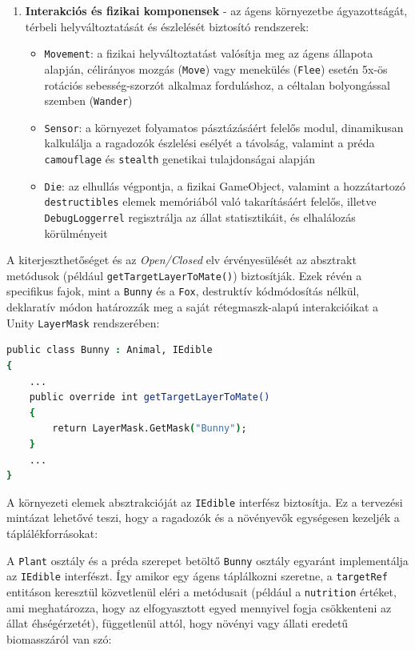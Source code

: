 \begin{enumerate}
    \item \textbf{Interakciós és fizikai komponensek} - az ágens környezetbe ágyazottságát, térbeli helyváltoztatását és észlelését biztosító rendszerek:
    \begin{itemize}
        \item \texttt{Movement}: a fizikai helyváltoztatást valósítja meg az ágens állapota alapján, célirányos mozgás (\texttt{Move}) vagy menekülés (\texttt{Flee}) esetén 5x-ös rotációs sebesség-szorzót alkalmaz forduláshoz, a céltalan bolyongással szemben (\texttt{Wander})
        \item \texttt{Sensor}: a környezet folyamatos pásztázásáért felelős modul, dinamikusan kalkulálja a ragadozók észlelési esélyét a távolság, valamint a préda \texttt{camouflage} és \texttt{stealth} genetikai tulajdonságai alapján
        \item \texttt{Die}: az elhullás végpontja, a fizikai GameObject, valamint a hozzátartozó \texttt{destructibles} elemek memóriából való takarításáért felelős, illetve \texttt{DebugLoggerrel} regisztrálja az állat statisztikáit, és elhalálozás körülményeit
    \end{itemize}
\end{enumerate}

A kiterjeszthetőséget és az \textit{Open/Closed} elv érvényesülését az absztrakt metódusok (például \texttt{getTargetLayerToMate()}) biztosítják. Ezek révén a specifikus fajok, mint a \texttt{Bunny} és a \texttt{Fox}, destruktív kódmódosítás nélkül, deklaratív módon határozzák meg a saját rétegmaszk-alapú interakcióikat a Unity \texttt{LayerMask} rendszerében:

\begin{lstlisting}[language=csh, caption={Nyulak esetén a célréteg kiválasztása}, label={lst:bunny_layer}]
public class Bunny : Animal, IEdible
{
    ...
    public override int getTargetLayerToMate()
    {
        return LayerMask.GetMask("Bunny");
    }
    ...
}
\end{lstlisting}

A környezeti elemek absztrakcióját az \texttt{IEdible} interfész biztosítja. Ez a tervezési mintázat lehetővé teszi, hogy a ragadozók és a növényevők egységesen kezeljék a táplálékforrásokat:

A \texttt{Plant} osztály és a préda szerepet betöltő \texttt{Bunny} osztály egyaránt implementálja az \texttt{IEdible} interfészt. Így amikor egy ágens táplálkozni szeretne, a \texttt{targetRef} entitáson keresztül közvetlenül eléri a metódusait (például a \texttt{nutrition} értéket, ami meghatározza, hogy az elfogyasztott egyed mennyivel fogja csökkenteni az állat éhségérzetét), függetlenül attól, hogy növényi vagy állati eredetű biomasszáról van szó:

